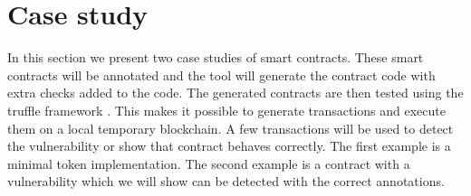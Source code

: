 \documentclass[a4paper]{article}
\begin{document}
\newpage
\section{Case study}
\label{sec:casestudy}
In this section we present two case studies of smart contracts. These smart contracts will be annotated and the tool will generate the contract code with extra checks added to the code. The generated contracts are then tested using the truffle framework \cite{truffleframework}. This makes it possible to generate transactions and execute them on a local temporary blockchain. A few transactions will be used to detect the vulnerability or show that contract behaves correctly. The first example is a minimal token implementation. The second example is a contract with a vulnerability which we will show can be detected with the correct annotations.
\end{document}
